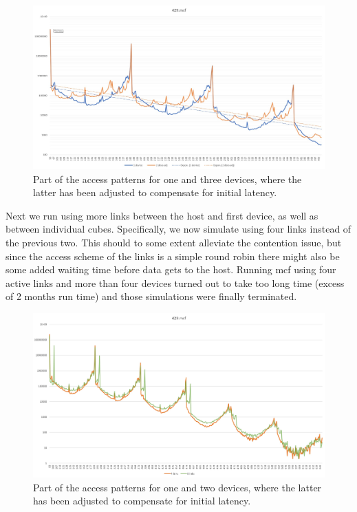 \begin{figure}[!ht]
    \centering
    \includegraphics[width=1.0\linewidth]{figure/429-x_4-2.jpg}
    \caption{Part of the access patterns for one and three devices, where the latter has been adjusted to compensate for initial latency.}
    \label{Memory-access-429-double}
\end{figure}

Next we run using more links between the host and first device, as well as between individual cubes. Specifically, we now simulate using four links instead of the previous two. This should to some extent alleviate the contention issue, but since the access scheme of the links is a simple round robin there might also be some added waiting time before data gets to the host. Running mcf using four active links and more than four devices turned out to take too long time (excess of 2 months run time) and those simulations were finally terminated.
\bigskip

\begin{figure}[!ht]
    \centering
    \includegraphics[width=1.0\linewidth]{figure/429-2_4-8.jpg}
    \caption{Part of the access patterns for one and two devices, where the latter has been adjusted to compensate for initial latency.}
    \label{Memory-access-429-link-compare}
\end{figure}

